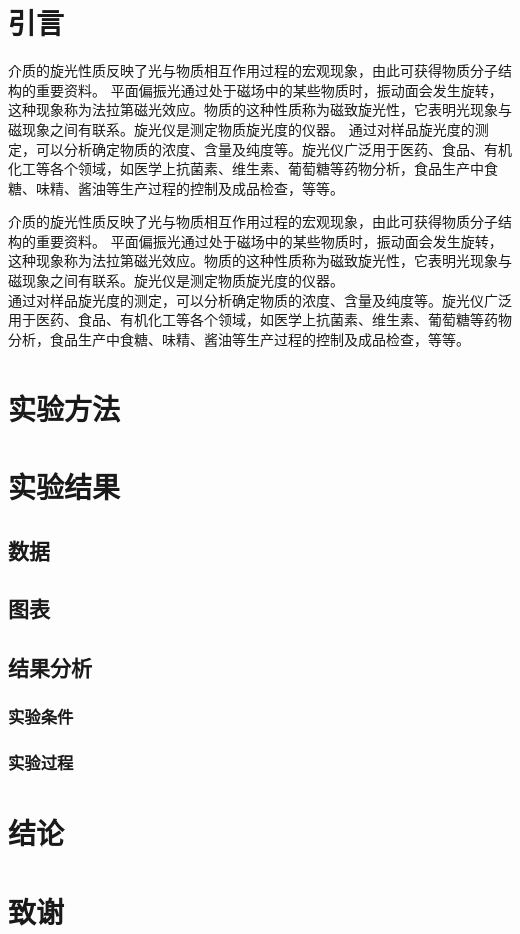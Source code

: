 \documentclass{article}%
\begin{document}
    \section{引言}
    介质的旋光性质反映了光与物质相互作用过程的宏观现象，由此可获得物质分子结构的重要资料。
    平面偏振光通过处于磁场中的某些物质时，振动面会发生旋转，这种现象称为法拉第磁光效应。物质的这种性质称为磁致旋光性，它表明光现象与磁现象之间有联系。旋光仪是测定物质旋光度的仪器。
    通过对样品旋光度的测定，可以分析确定物质的浓度、含量及纯度等。旋光仪广泛用于医药、食品、有机化工等各个领域，如医学上抗菌素、维生素、葡萄糖等药物分析，食品生产中食糖、味精、酱油等生产过程的控制及成品检查，等等。
    
    介质的旋光性质反映了光与物质相互作用过程的宏观现象，由此可获得物质分子结构的重要资料。
    平面偏振光通过处于磁场中的某些物质时，振动面会发生旋转，这种现象称为法拉第磁光效应。物质的这种性质称为磁致旋光性，它表明光现象与磁现象之间有联系。旋光仪是测定物质旋光度的仪器。
    \\通过对样品旋光度的测定，可以分析确定物质的浓度、含量及纯度等。旋光仪广泛用于医药、食品、有机化工等各个领域，如医学上抗菌素、维生素、葡萄糖等药物分析，食品生产中食糖、味精、酱油等生产过程的控制及成品检查，等等。


    \section{实验方法}
    \section{实验结果}

    \subsection{数据}
    \subsection{图表}
    \subsection{结果分析}
    \subsubsection{实验条件}
    \subsubsection{实验过程}

    \section{结论}
    \section{致谢}
\end{document}
